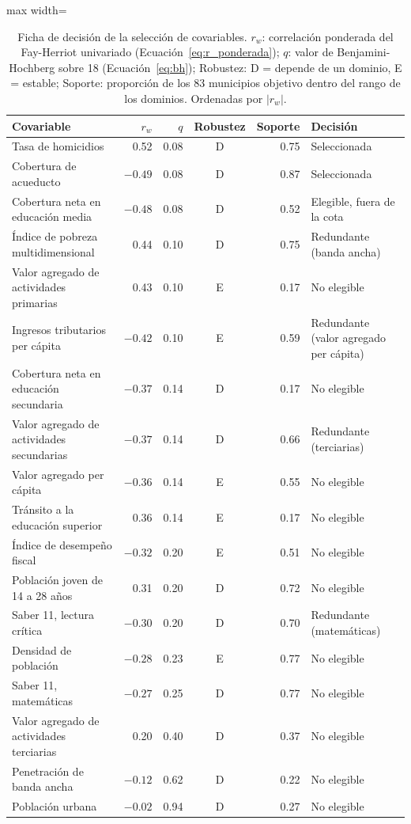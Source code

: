 \begin{table}[!htbp]
\centering
\small
\caption{Ficha de decisión de la selección de covariables. $r_w$: correlación ponderada del Fay-Herriot univariado (Ecuación~\ref{eq:r_ponderada}); $q$: valor de Benjamini-Hochberg sobre 18 (Ecuación~\ref{eq:bh}); Robustez: D = depende de un dominio, E = estable; Soporte: proporción de los 83 municipios objetivo dentro del rango de los dominios. Ordenadas por $|r_w|$.}
\label{tab:res_seleccion}
\begin{adjustbox}{max width=\linewidth}
\begin{tabular}{l r r c r l}
\toprule
Covariable & $r_w$ & $q$ & Robustez & Soporte & Decisión \\
\midrule
Tasa de homicidios & 0.52 & 0.08 & D & 0.75 & Seleccionada \\
Cobertura de acueducto & $-0.49$ & 0.08 & D & 0.87 & Seleccionada \\
Cobertura neta en educación media & $-0.48$ & 0.08 & D & 0.52 & Elegible, fuera de la cota \\
Índice de pobreza multidimensional & 0.44 & 0.10 & D & 0.75 & Redundante (banda ancha) \\
Valor agregado de actividades primarias & 0.43 & 0.10 & E & 0.17 & No elegible \\
Ingresos tributarios per cápita & $-0.42$ & 0.10 & E & 0.59 & Redundante (valor agregado per cápita) \\
Cobertura neta en educación secundaria & $-0.37$ & 0.14 & D & 0.17 & No elegible \\
Valor agregado de actividades secundarias & $-0.37$ & 0.14 & D & 0.66 & Redundante (terciarias) \\
Valor agregado per cápita & $-0.36$ & 0.14 & E & 0.55 & No elegible \\
Tránsito a la educación superior & 0.36 & 0.14 & E & 0.17 & No elegible \\
Índice de desempeño fiscal & $-0.32$ & 0.20 & E & 0.51 & No elegible \\
Población joven de 14 a 28 años & 0.31 & 0.20 & D & 0.72 & No elegible \\
Saber 11, lectura crítica & $-0.30$ & 0.20 & D & 0.70 & Redundante (matemáticas) \\
Densidad de población & $-0.28$ & 0.23 & E & 0.77 & No elegible \\
Saber 11, matemáticas & $-0.27$ & 0.25 & D & 0.77 & No elegible \\
Valor agregado de actividades terciarias & 0.20 & 0.40 & D & 0.37 & No elegible \\
Penetración de banda ancha & $-0.12$ & 0.62 & D & 0.22 & No elegible \\
Población urbana & $-0.02$ & 0.94 & D & 0.27 & No elegible \\
\bottomrule
\end{tabular}
\end{adjustbox}
\end{table}

